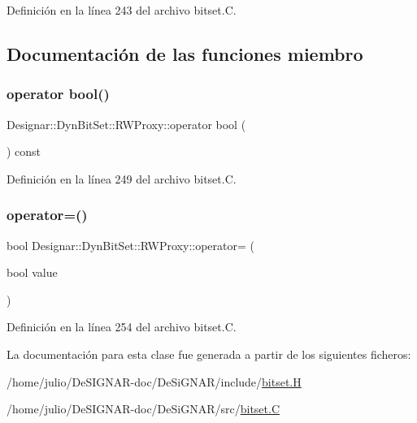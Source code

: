 Definición en la línea 243 del archivo bitset.\+C.



\subsection{Documentación de las funciones miembro}
\mbox{\label{class_designar_1_1_dyn_bit_set_1_1_r_w_proxy_ae2b7bc44f30f8b75d8fc2306167f9598}} 
\subsubsection{\texorpdfstring{operator bool()}{operator bool()}}
{\footnotesize\ttfamily Designar\+::\+Dyn\+Bit\+Set\+::\+R\+W\+Proxy\+::operator bool (\begin{DoxyParamCaption}{ }\end{DoxyParamCaption}) const}



Definición en la línea 249 del archivo bitset.\+C.

\mbox{\label{class_designar_1_1_dyn_bit_set_1_1_r_w_proxy_ad9dff242f5550a97af94c1e4ecd163ad}} 
\subsubsection{\texorpdfstring{operator=()}{operator=()}}
{\footnotesize\ttfamily bool Designar\+::\+Dyn\+Bit\+Set\+::\+R\+W\+Proxy\+::operator= (\begin{DoxyParamCaption}\item[{bool}]{value }\end{DoxyParamCaption})}



Definición en la línea 254 del archivo bitset.\+C.



La documentación para esta clase fue generada a partir de los siguientes ficheros\+:\begin{DoxyCompactItemize}
\item 
/home/julio/\+De\+S\+I\+G\+N\+A\+R-\/doc/\+De\+Si\+G\+N\+A\+R/include/\hyperlink{bitset_8_h}{bitset.\+H}\item 
/home/julio/\+De\+S\+I\+G\+N\+A\+R-\/doc/\+De\+Si\+G\+N\+A\+R/src/\hyperlink{bitset_8_c}{bitset.\+C}\end{DoxyCompactItemize}
